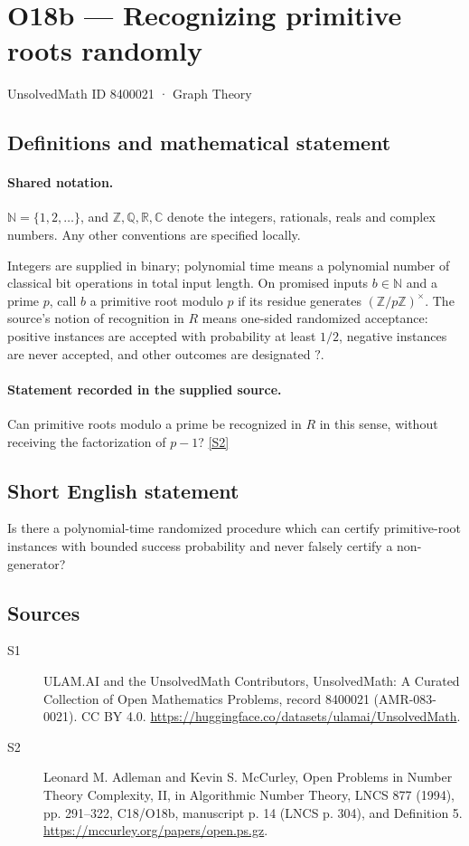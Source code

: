 \documentclass[11pt]{article}
\newcommand{\sref}[2]{\hyperlink{source:#1:#2}{[S#2]}}
\begin{document}
\setcounter{section}{8400020}
\section{O18b — Recognizing primitive roots randomly}\label{8400021}
{\small\sffamily UnsolvedMath ID 8400021 · Graph Theory}
\subsection{Definitions and mathematical statement}

\paragraph{Shared notation.}$\mathbb N=\{1,2,\ldots\}$, and $\mathbb Z,\mathbb Q,\mathbb R,\mathbb C$ denote the integers, rationals, reals and complex numbers. Any other conventions are specified locally.


Integers are supplied in binary; polynomial time means a polynomial number of classical bit operations in total input length. On promised inputs $b\in\mathbb N$ and a prime $p$, call $b$ a primitive root modulo $p$ if its residue generates $(\mathbb Z/p\mathbb Z)^\times$. The source's notion of recognition in $R$ means one-sided randomized acceptance: positive instances are accepted with probability at least $1/2$, negative instances are never accepted, and other outcomes are designated $?$.
\paragraph{Statement recorded in the supplied source.}
Can primitive roots modulo a prime be recognized in $R$ in this sense, without receiving the factorization of $p-1$? \sref{8400021}{2}
\subsection{Short English statement}
Is there a polynomial-time randomized procedure which can certify primitive-root instances with bounded success probability and never falsely certify a non-generator?
\subsection{Sources}
\begin{description}
\item[\hypertarget{source:8400021:1}{S1}] ULAM.AI and the UnsolvedMath Contributors, UnsolvedMath: A Curated Collection of Open Mathematics Problems, record 8400021 (AMR-083-0021). CC BY 4.0. \url{https://huggingface.co/datasets/ulamai/UnsolvedMath}.
\item[\hypertarget{source:8400021:2}{S2}] Leonard M. Adleman and Kevin S. McCurley, Open Problems in Number Theory Complexity, II, in Algorithmic Number Theory, LNCS 877 (1994), pp. 291--322, C18/O18b, manuscript p. 14 (LNCS p. 304), and Definition 5. \url{https://mccurley.org/papers/open.ps.gz}.
\end{description}
\label{end:8400021}
\end{document}

